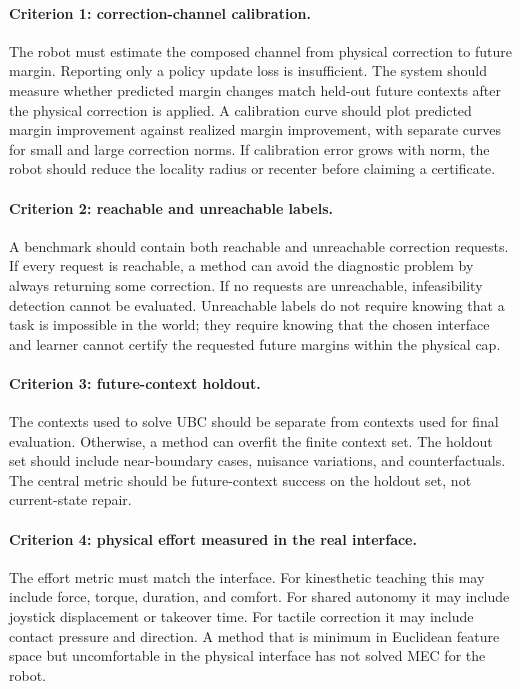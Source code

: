 \documentclass{article}
\begin{document}
\paragraph{Criterion 1: correction-channel calibration.}
The robot must estimate the composed channel from physical correction to future
margin. Reporting only a policy update loss is insufficient. The system should
measure whether predicted margin changes match held-out future contexts after
the physical correction is applied. A calibration curve should plot predicted
margin improvement against realized margin improvement, with separate curves for
small and large correction norms. If calibration error grows with norm, the
robot should reduce the locality radius or recenter before claiming a
certificate.

\paragraph{Criterion 2: reachable and unreachable labels.}
A benchmark should contain both reachable and unreachable correction requests.
If every request is reachable, a method can avoid the diagnostic problem by
always returning some correction. If no requests are unreachable, infeasibility
detection cannot be evaluated. Unreachable labels do not require knowing that a
task is impossible in the world; they require knowing that the chosen interface
and learner cannot certify the requested future margins within the physical cap.

\paragraph{Criterion 3: future-context holdout.}
The contexts used to solve UBC should be separate from contexts used for final
evaluation. Otherwise, a method can overfit the finite context set. The holdout
set should include near-boundary cases, nuisance variations, and
counterfactuals. The central metric should be future-context success on the
holdout set, not current-state repair.

\paragraph{Criterion 4: physical effort measured in the real interface.}
The effort metric must match the interface. For kinesthetic teaching this may
include force, torque, duration, and comfort. For shared autonomy it may include
joystick displacement or takeover time. For tactile correction it may include
contact pressure and direction. A method that is minimum in Euclidean feature
space but uncomfortable in the physical interface has not solved MEC for the
robot.
\end{document}
